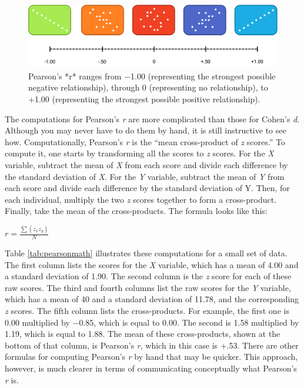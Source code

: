 \documentclass[
]{krantz}
\begin{document}
\begin{figure}

{\centering \includegraphics[width=0.8\linewidth]{images/ch12/pearson} 

}

\caption{Pearson’s *r* ranges from −1.00 (representing the strongest possible negative relationship), through 0 (representing no relationship), to +1.00 (representing the strongest possible positive relationship).}\label{fig:pearson2}
\end{figure}

The computations for Pearson's \emph{r} are more complicated than those for Cohen's \emph{d}. Although you may never have to do them by hand, it is still instructive to see how. Computationally, Pearson's \emph{r} is the ``mean cross-product of \emph{z} scores.'' To compute it, one starts by transforming all the scores to \emph{z} scores. For the \emph{X} variable, subtract the mean of \emph{X} from each score and divide each difference by the standard deviation of \emph{X}. For the \emph{Y} variable, subtract the mean of \emph{Y} from each score and divide each difference by the standard deviation of Y. Then, for each individual, multiply the two \emph{z} scores together to form a cross-product. Finally, take the mean of the cross-products. The formula looks like this:

\(r=\frac{\sum(z_xz_y)}{N}\)

Table \ref{tab:pearsonmath} illustrates these computations for a small set of data. The first column lists the scores for the \emph{X} variable, which has a mean of 4.00 and a standard deviation of 1.90. The second column is the \emph{z} score for each of these raw scores. The third and fourth columns list the raw scores for the \emph{Y} variable, which has a mean of 40 and a standard deviation of 11.78, and the corresponding \emph{z} scores. The fifth column lists the cross-products. For example, the first one is 0.00 multiplied by −0.85, which is equal to 0.00. The second is 1.58 multiplied by 1.19, which is equal to 1.88. The mean of these cross-products, shown at the bottom of that column, is Pearson's \emph{r}, which in this case is +.53. There are other formulas for computing Pearson's \emph{r} by hand that may be quicker. This approach, however, is much clearer in terms of communicating conceptually what Pearson's \emph{r} is.
\end{document}

